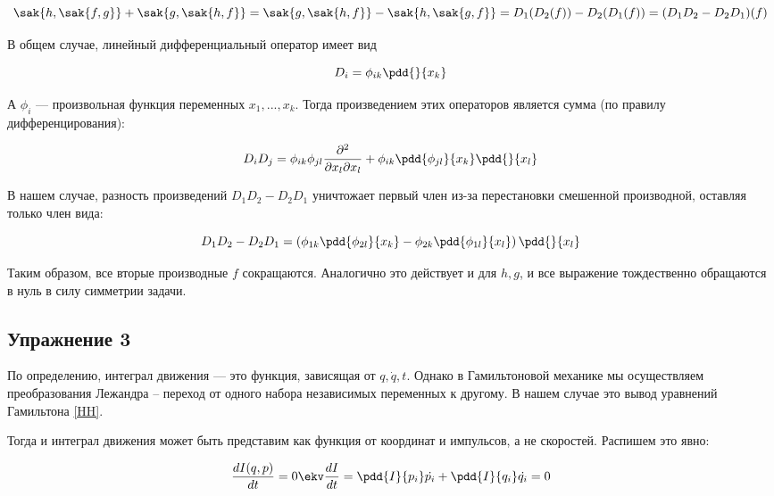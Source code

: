 \documentclass[12pt]{kiarticle}
\begin{document}
	\begin{equation}\label{}
	\sak{h,\sak{f, g}} + \sak{g,\sak{h, f}} = \sak{g,\sak{h, f}} - \sak{h,\sak{g, f}} = D_1(D_2(f)) - D_2(D_1(f)) = (D_1D_2 - D_2D_1)(f)
	\end{equation}
	
	В общем случае, линейный дифференциальный оператор имеет вид
	
	\begin{equation}\label{}
	D_i = \phi_{ik} \pdd{}{x_k}
	\end{equation}
	
	А $ \phi_i $ --- произвольная функция переменных $ x_1, ..., x_k $. Тогда произведением этих операторов является сумма (по правилу дифференцирования):
	
	\begin{equation}\label{}
	D_iD_j = \phi_{ik}\phi_{jl}\dfrac{\partial^2}{\partial x_l \partial x_l} + \phi_{ik} \pdd{\phi_{jl}}{x_k}\pdd{}{x_l}
	\end{equation}
	
	В нашем случае, разность произведений $ D_1D_2 - D_2D_1 $ уничтожает первый член из-за перестановки смешенной производной, оставляя только член вида:
	
	\begin{equation}\label{}
	D_1D_2 - D_2D_1 =  \left( \phi_{1k}\pdd{\phi_{2l}}{x_k} - \phi_{2k}\pdd{\phi_{1l}}{x_l} \right) \pdd{}{x_l} 
	\end{equation}
	
	Таким образом, все вторые производные $ f $ сокращаются. Аналогично это действует и для $ h, g $, и все выражение тождественно обращаются в нуль в силу симметрии задачи. 
	
	
	\subsection{Упражнение 3}
	
	По определению, интеграл движения --- это функция, зависящая от $ q, \dot{q}, t $.  Однако в Гамильтоновой механике мы осуществляем преобразования Лежандра -- переход от одного набора независимых переменных к другому. В нашем случае это вывод уравнений Гамильтона \eqref{HH}. 
	
	Тогда и интеграл движения может быть представим как функция от координат и импульсов, а не скоростей. Распишем это явно:
	
	\begin{equation}\label{}
	\dfrac{dI(q, p)}{dt} = 0 \ekv \dfrac{dI}{dt} = \pdd{I}{p_i}\dot{p_i} + \pdd{I}{q_i}\dot{q_i} = 0
	\end{equation}
	
\end{document}
